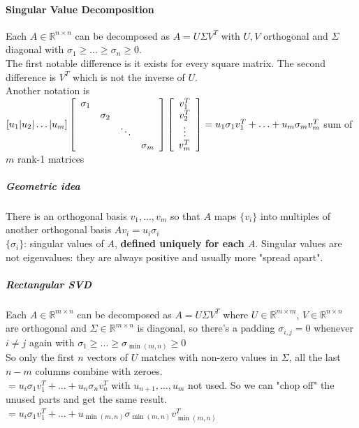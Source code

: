 \documentclass[10pt]{report}
\begin{document}
\paragraph{Singular Value Decomposition} Each $A\in \mathbb{R}^{n\times n}$ can be decomposed as $A = U\Sigma V^T$ with $U, V$ orthogonal and $\Sigma$ diagonal with $\sigma_1 \geq \ldots \geq \sigma_n \geq 0$.\\
The first notable difference is it exists for every square matrix. The second difference is $V^T$ which is not the inverse of $U$.\\
Another notation is $[u_1|u_2|\ldots|u_m]\left[\begin{array}{c c c c}
\sigma_1\\ & \sigma_2\\ & & \ddots\\ & & & \sigma_m
\end{array} \right]\left[\begin{array}{c}
v_1^T\\v_2^T\\\vdots\\v_m^T
\end{array} \right] = u_1\sigma_1 v_1^T + \ldots + u_m\sigma_m v_m^T$ sum of $m$ rank-1 matrices\\
\subparagraph{Geometric idea} There is an orthogonal basis $v_1,\ldots, v_m$ so that $A$ maps $\{v_i\}$ into multiples of another orthogonal basis $A v_i = u_i \sigma_i$\\
$\{\sigma_i\}$: singular values of $A$, \textbf{defined uniquely for each $A$}. Singular values are not eigenvalues: they are always positive and usually more "spread apart".\\
\subparagraph{Rectangular SVD} Each $A\in \mathbb{R}^{m\times n}$ can be decomposed as $A = U\Sigma V^T$ where $U\in \mathbb{R}^{m\times m}$, $V \in \mathbb{R}^{n\times n}$ are orthogonal and $\Sigma\in \mathbb{R}^{m\times n}$ is diagonal, so there's a padding $\sigma_{i,j} = 0$ whenever $i\neq j$ again with $\sigma_1 \geq \ldots \geq \sigma_{\min(m, n)} \geq 0$\\
So only the first $n$ vectors of $U$ matches with non-zero values in $\Sigma$, all the last $n-m$ columns combine with zeroes.\\
$= u_i\sigma_1 v_1^T + \ldots + u_n \sigma_n v_n^T$ with $u_{n+1},\ldots, u_m$ not used. So we can "chop off" the unused parts and get the same result.\\
$= u_i\sigma_1 v_1^T + \ldots + u_{\min(m, n)} \sigma_{\min(m, n)} v_{\min(m, n)}^T$
\end{document}
